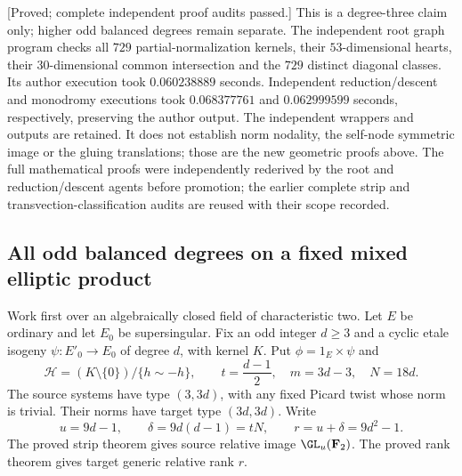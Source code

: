 \begin{remark}
\label{rem:mixed-d3-norm-scope-candidate}
\textup{[Proved; complete independent proof audits passed.]}
This is a degree-three claim only; higher odd balanced degrees
remain separate. The independent root graph program
checks all $729$ partial-normalization kernels, their
$53$-dimensional hearts, their $30$-dimensional common
intersection and the $729$ distinct diagonal classes.
Its author execution took $0.060238889$ seconds. Independent
reduction/descent and monodromy executions took $0.068377761$
and $0.062999599$ seconds, respectively, preserving the author
output. The independent wrappers and outputs are retained.
It does not establish norm nodality, the self-node symmetric
image or the gluing translations; those are the new geometric
proofs above. The full mathematical proofs were independently
rederived by the root and reduction/descent agents before promotion;
the earlier complete strip and transvection-classification audits
are reused with their scope recorded.
\end{remark}


\subsection{All odd balanced degrees on a fixed mixed elliptic product}
\label{subsec:mixed-all-odd-norm-candidate}

Work first over an algebraically closed field of characteristic two.
Let $E$ be ordinary and let $E_0$ be supersingular. Fix an odd integer
$d\geq3$ and a cyclic etale isogeny
$\psi:E'_0\longrightarrow E_0$ of degree $d$, with kernel $K$.
Put $\phi=1_E\times\psi$ and
\[
 \mathcal H=(K\setminus\{0\})/\{h\sim-h\},\qquad
 t=\frac{d-1}{2},\quad m=3d-3,\quad N=18d.
\]
The source systems have type $(3,3d)$, with any fixed Picard twist
whose norm is trivial. Their norms have target type $(3d,3d)$.
Write
\[
 u=9d-1,\qquad \delta=9d(d-1)=tN,\qquad r=u+\delta=9d^2-1.
\]
The proved strip theorem gives source relative image $\GL_u(\mathbf F_2)$.
The proved rank theorem gives target generic relative rank $r$.


